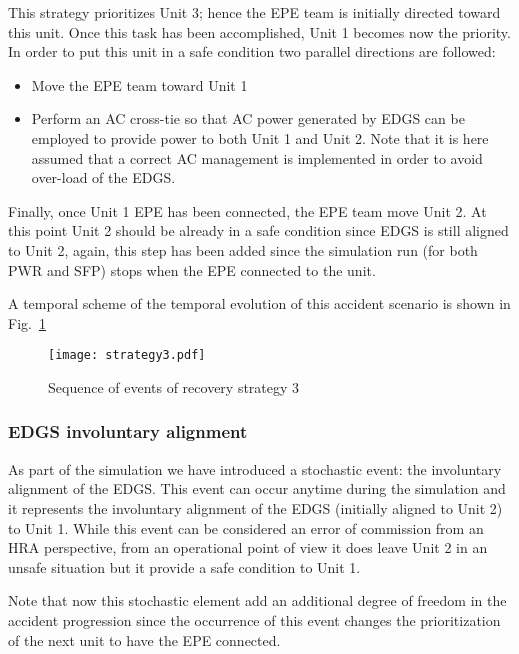 This strategy prioritizes Unit 3; hence the EPE team is initially directed toward this unit. 
Once this task has been accomplished, Unit 1 becomes now the priority. In order to put this unit in a safe 
condition two parallel directions are followed: 

\begin{itemize}
  \item Move the EPE team toward Unit 1 
  \item Perform an AC cross-tie so that AC power generated by EDGS can be employed to provide power to both Unit
        1 and Unit 2. Note that it is here assumed that a correct AC management is implemented in order to avoid
        over-load of the EDGS.
\end{itemize}

Finally, once Unit 1 EPE has been connected, the EPE team move Unit 2. At this point Unit 2 should be already in a 
safe condition since EDGS is still aligned to Unit 2, again, this step has been added since the simulation run (for 
both PWR and SFP) stops when the EPE connected to the unit.

A temporal scheme of the temporal evolution of this accident scenario is shown in Fig.~\ref{fig:strategy3Scheme}

\begin{figure}
    \centering
    \centerline{\texttt{[image: strategy3.pdf]}}
    \caption{Sequence of events of recovery strategy 3}
    \label{fig:strategy3Scheme}
\end{figure}

\subsubsection{EDGS involuntary alignment}
\label{sec:EDGSinvolAlign}

As part of the simulation we have introduced a stochastic event: the involuntary alignment of the EDGS.
This event can occur anytime during the simulation and it represents the involuntary alignment of the EDGS 
(initially aligned to Unit 2) to Unit 1. 
While this event can be considered an error of commission from an HRA perspective, from an operational point of view 
it does leave Unit 2 in an unsafe situation but it provide a safe condition to Unit 1. 

Note that now this stochastic element add an additional degree of freedom in the accident progression since the 
occurrence of this event changes the prioritization of the next unit to have the EPE connected.

